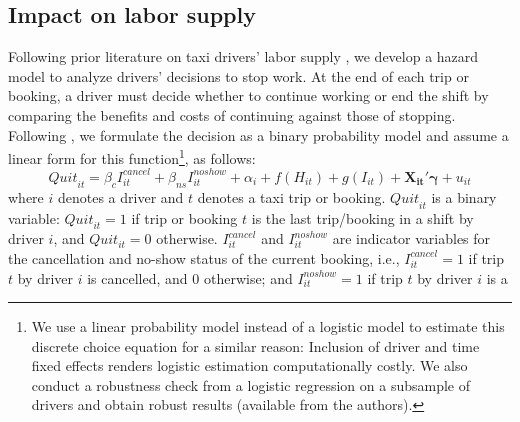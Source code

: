 \documentclass[reviewmode,AEJ]{AEA}
\begin{document}
\subsection{Impact on labor supply}
Following prior literature on taxi drivers' labor supply \citep{farber2005tomorrow,farber2015you,agarwal2015singaporean,chen2015dynamic}, we develop a hazard model 
to analyze drivers' decisions to stop work. At the end of each trip or booking, a driver must decide whether
to continue working or end the shift by comparing the benefits and costs of continuing against those of stopping. 
Following \citet{farber2005tomorrow,farber2015you}, we  
formulate the decision as a  binary probability model 
and assume a linear form for this function\footnote{We %
 use a linear probability model instead of a logistic model to estimate this discrete choice equation
 for a similar reason: Inclusion of driver and time fixed effects renders logistic estimation computationally
 costly. We also conduct a robustness check from a logistic regression on a subsample of drivers 
 and obtain robust results (available from the authors).}, as follows:
\begin{equation}
\label{eq:quit}
{Quit}_{it} = \beta_{c}I^{cancel}_{it} + \beta_{ns} I^{noshow}_{it} + \alpha_i + f(H_{it}) + g(I_{it}) + \mathbf{X_{it}}'\mathbf{\gamma}  + u_{it}
\end{equation}
where $i$ denotes a driver and $t$ denotes a taxi trip or booking. ${Quit}_{it}$ is a binary
variable: ${Quit}_{it} = 1$ if trip or booking $t$ is the last trip/booking in a shift by driver $i$,
and $Quit_{it} = 0$ otherwise. $I^{cancel}_{it}$ and $I^{noshow}_{it}$ are indicator variables for
the cancellation and no-show status of the current booking, i.e., $I^{cancel}_{it}=1$ if trip $t$ 
by driver $i$ is cancelled, and $0$ otherwise; and $I^{noshow}_{it}=1$ if trip $t$ by driver $i$ is a 
\end{document}
